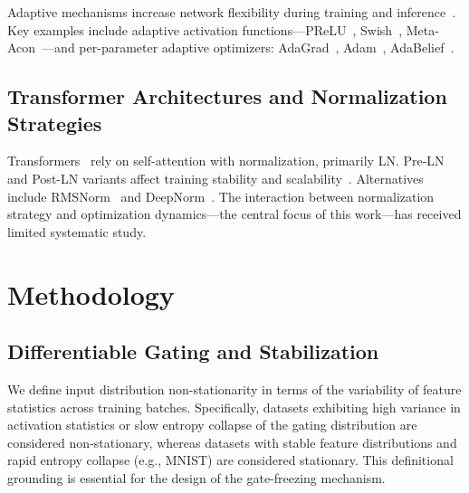 \documentclass[final,3p,times,twocolumn]{elsarticle}
\begin{document}
Adaptive mechanisms increase network flexibility during training and
inference~\cite{he2015prelu,ramachandran2017swish,ma2020metaacon,hu2018squeeze,chen2020dynamic}.
Key examples include adaptive activation functions---PReLU~\cite{he2015prelu},
Swish~\cite{ramachandran2017swish}, Meta-Acon~\cite{ma2020metaacon}---and
per-parameter adaptive optimizers: AdaGrad~\cite{duchi2011adagrad},
Adam~\cite{kingma2014adam}, AdaBelief~\cite{zhuang2020adabelief}.

\subsection{Transformer Architectures and Normalization Strategies}

Transformers~\cite{vaswani2017attention} rely on self-attention with
normalization, primarily LN. Pre-LN and Post-LN variants affect
training stability and scalability~\cite{xiong2020layernorm,wang2022deepnorm,bachlechner2020rezero}.
Alternatives include RMSNorm~\cite{zhang2019root} and
DeepNorm~\cite{wang2022deepnorm}. The interaction between normalization
strategy and optimization dynamics---the central focus of this
work---has received limited systematic study.


\section{Methodology}

\subsection{Differentiable Gating and Stabilization}
\label{sec:bottleneck_def}

We define input distribution non-stationarity in terms of the variability
of feature statistics across training batches. Specifically, datasets
exhibiting high variance in activation statistics or slow entropy
collapse of the gating distribution are considered non-stationary,
whereas datasets with stable feature distributions and rapid entropy
collapse (e.g., MNIST) are considered stationary. This definitional
grounding is essential for the design of the gate-freezing mechanism.
\end{document}

